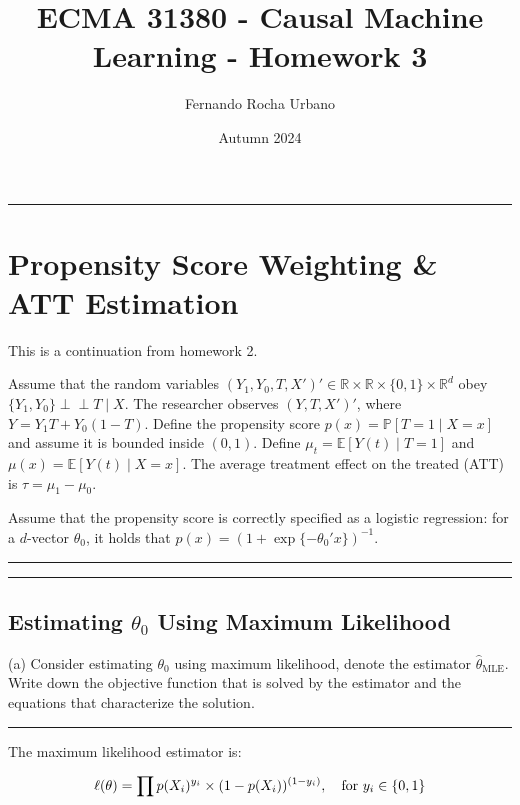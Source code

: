 \documentclass{article}
\title{ECMA 31380 - Causal Machine Learning - Homework 3}
\author{Fernando Rocha Urbano}
\date{Autumn 2024}
\newenvironment{colorparagraph}[1]{\par\color{#1}}{\par}
\begin{document}
\maketitle

\begin{colorparagraph}{questioncolor}
\rule{\textwidth}{0.5pt}
\label{q1}
\section{Propensity Score Weighting \& ATT Estimation}

This is a continuation from homework 2.

Assume that the random variables \((Y_1, Y_0, T, X')' \in \mathbb{R} \times \mathbb{R} \times \{0, 1\} \times \mathbb{R}^d\) obey \(\{Y_1, Y_0\} \perp\!\!\!\perp T \mid X\).
The researcher observes \((Y, T, X')'\), where \( Y = Y_1 T + Y_0 (1 - T) \).
Define the propensity score \( p(x) = \mathbb{P}[T = 1 \mid X = x] \) and assume it is bounded inside \( (0, 1) \).
Define \( \mu_t = \mathbb{E}[Y(t) \mid T = 1] \) and \( \mu(x) = \mathbb{E}[Y(t) \mid X = x] \).
The average treatment effect on the treated (ATT) is \( \tau = \mu_1 - \mu_0 \).

Assume that the propensity score is correctly specified as a logistic regression: for a \( d \)-vector \( \theta_0 \), it holds that \( p(x) = (1 + \exp\{-\theta_0' x\})^{-1} \).

\rule{\textwidth}{0.5pt}
\end{colorparagraph}

\begin{colorparagraph}{questioncolor}
\label{q1a}
\rule{\textwidth}{0.5pt}
\subsection{Estimating \( \theta_0 \) Using Maximum Likelihood}
(a) Consider estimating \( \theta_0 \) using maximum likelihood, denote the estimator \( \hat{\theta}_{\text{MLE}} \).
Write down the objective function that is solved by the estimator and the equations that characterize the solution.

\rule{\textwidth}{0.5pt}
\end{colorparagraph}

The maximum likelihood estimator is:

$$
\ell(\theta) = \prod p(X_i)^{y_i} \times (1 - p(X_i))^{(1 - y_i)}, \quad \text{for} \\\ y_i \in \{ 0, 1 \}
$$
\end{document}
